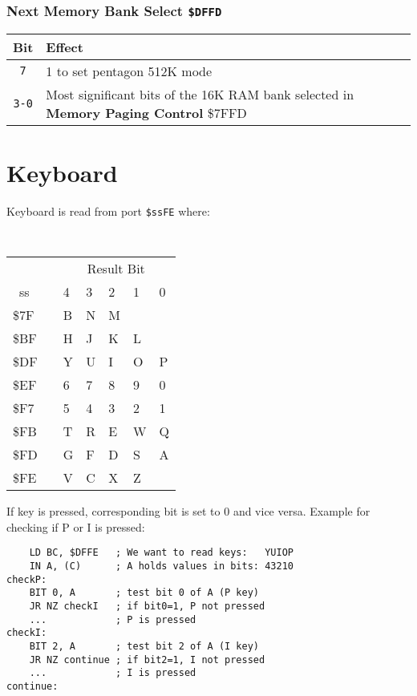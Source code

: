 \documentclass[twoside,openright,a4paper]{book}
\newcommand{\instrt}{\rule{0pt}{2.7ex}}
\newcommand{\instrb}{\rule[-1.7ex]{0pt}{0pt}}
\newcommand{\notet}{\rule{0pt}{2.4ex}}
\begin{document}
\subsubsection{Next Memory Bank Select {\tt \$DFFD}}

\begin{tabular}{cp{12cm}}
	Bit & Effect \\
	\hline
	{\tt 7}\notet & 
		1 to set pentagon 512K mode \\
	{\tt 3-0}\notet &
		Most significant bits of the 16K RAM bank selected in \textbf{Memory Paging Control} \$7FFD  \\
\end{tabular}


\pagebreak
\section{Keyboard}
\label{zx_next_keyboard}

Keyboard is read from port {\tt \$ssFE} where:

{\tt 
	\begin{tabular}{p{0.7cm}|cp{1cm}p{1cm}p{1cm}p{1.2cm}p{1.2cm}}

		   & & \multicolumn{5}{c}{Result Bit} \\
		~ss & & 4 & 3 & 2 & 1 & 0 \instrb \\
		\hline
		\$7F\instrt & & B & N & M & \fbox{Symb} & \fbox{Space} \\
		\$BF\instrt & & H & J & K & L & \fbox{Enter} \\
		\$DF\instrt & & Y & U & I & O & P \\
		\$EF\instrt & & 6 & 7 & 8 & 9 & 0 \\
		\$F7\instrt & & 5 & 4 & 3 & 2 & 1 \\
		\$FB\instrt & & T & R & E & W & Q \\
		\$FD\instrt & & G & F & D & S & A \\
		\$FE\instrt\instrb & & V & C & X & Z & \fbox{Caps} \\

	\end{tabular}
}

If key is pressed, corresponding bit is set to 0 and vice versa. Example for checking if P or I is pressed:
	
\begin{Verbatim}
	LD BC, $DFFE   ; We want to read keys:   YUIOP
	IN A, (C)      ; A holds values in bits: 43210
checkP:
	BIT 0, A       ; test bit 0 of A (P key)
	JR NZ checkI   ; if bit0=1, P not pressed
	...            ; P is pressed
checkI:
	BIT 2, A       ; test bit 2 of A (I key)
	JR NZ continue ; if bit2=1, I not pressed
	...            ; I is pressed
continue:
\end{Verbatim}
\end{document}
